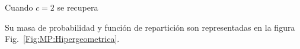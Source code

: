 Cuando $c = 2$ se recupera 

Su masa  de probabilidad  y funci\'on de  repartici\'on son representadas  en la
figura Fig.~\ref{Fig:MP:Hipergeometrica}.
%
\begin{figure}[h!]
%
\label{Fig:MP:HipergeometricaMultivariada}
\end{figure}



